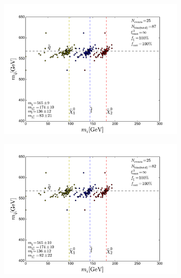 \documentclass[twoside,english]{uiofysmaster}
\begin{document}
\begin{figure}[hbt]
	\centering
	\begin{subfigure}[b]{0.45\textwidth}
		\includegraphics[width=\textwidth]{figures/improving_combinatorics/herwigpp-momcons_nocomb_truemasspoint.pdf} 
		\caption{ }
	\end{subfigure}
	\begin{subfigure}[b]{0.45\textwidth}
		\includegraphics[width=\textwidth]{figures/improving_combinatorics/herwigpp-momcons_nocomb_400-300-200-100.pdf}
		\caption{ } 
	\end{subfigure}


\end{figure}
\end{document}
